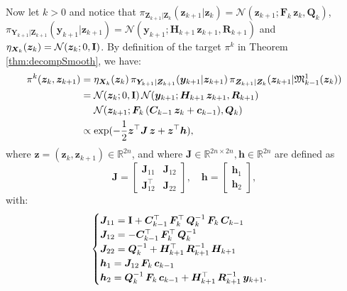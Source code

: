 \documentclass[twoside,11pt]{article}
\newcommand{\Gauss}{\mathcal{N}}                                      %
\newcommand{\re}{\mathbb{R}}
\newcommand{\Xb}{\boldsymbol{X}}
\newcommand{\Yb}{\boldsymbol{Y}}
\newcommand{\yb}{\boldsymbol{y}}
\newcommand{\Zb}{\boldsymbol{Z}}
\newcommand{\zb}{\boldsymbol{z}}
\newcommand{\Fb}{\boldsymbol{F}}
\newcommand{\Hb}{\boldsymbol{H}}
\newcommand{\hb}{\boldsymbol{h}}
\newcommand{\Qb}{\boldsymbol{Q}}
\newcommand{\Rb}{\boldsymbol{R}}
\newcommand{\Cb}{\boldsymbol{C}}
\newcommand{\cb}{\boldsymbol{c}}
\newcommand{\Jb}{\boldsymbol{J}}
\newcommand{\submap}{\mathfrak{M}}
\begin{document}
Now let $k>0$ and
notice that $\pi_{\Zb_{k+1} \vert \Zb_k}(\zb_{k+1}\vert \zb_k) = 
\Gauss( \zb_{k+1}; \Fb_k\,\zb_k, \Qb_k )$,
$\pi_{\Yb_{k+1} \vert \Zb_{k+1}}(\yb_{k+1} \vert \zb_{k+1}) = 
\Gauss( \yb_{k+1}; \Hb_{k+1}\,\zb_{k+1} , \Rb_{k+1} )$ and
$\eta_{\Xb_k}(\zb_k) = \Gauss( \zb_k; 0, {\bf I} )$.
By definition of the target $\pi^k$ in Theorem \ref{thm:decompSmooth}, we have:
\begin{align}
  \pi^k(\zb_k, \zb_{k+1}) &= \eta_{\Xb_k}(\zb_k) \,
                  \pi_{\Yb_{k+1} \vert \Zb_{k+1}}(\yb_{k+1} \vert \zb_{k+1}) \,
                  \pi_{\Zb_{k+1} \vert \Zb_k}(\zb_{k+1}\vert 
                  \submap_{k-1}^1(\zb_k) )  \\
              &=   \Gauss( \zb_k; 0, {\bf I} ) \,
                  \Gauss( \yb_{k+1}; \Hb_{k+1}\,\zb_{k+1} , \Rb_{k+1} )\,
                   \\
              &\phantom{{}={}}    
                  \Gauss( \zb_{k+1};
                  \Fb_k\,( \Cb_{k-1} \, \zb_k + \cb_{k-1}), \Qb_k ) \\
              &\propto    
                  \exp( -\frac{1}{2} \zb^\top \Jb\,\zb + \zb^\top \hb ),  
\end{align}
where $\zb = (\zb_k , \zb_{k+1})\in \re^{2n}$, and where
$\Jb \in \re^{2n \times 2n} , \hb \in \re^{2n}$ are defined as
\begin{equation}
 \Jb =  \left[\begin{array}{cc}
  \Jb_{11} & \Jb_{12} \\[3pt] 
  \Jb_{12}^\top & \Jb_{22}
  \end{array}\right], \quad
 \hb = \left[\begin{array}{c}
  \hb_{1}  \\ 
  \hb_{2}
  \end{array}\right],
\end{equation}
with:
\begin{equation}
  \begin{cases} 
    \Jb_{11} = {\bf I} + \Cb_{k-1}^\top\,\Fb_k^\top \, \Qb_k^{-1}\,\Fb_k\,\Cb_{k-1}    \\ 
    \Jb_{12} = - \Cb_{k-1}^\top\,\Fb_k^\top\,\Qb_k^{-1} \\
    \Jb_{22} = \Qb_k^{-1} + \Hb_{k+1}^\top\,\Rb_{k+1}^{-1}\,\Hb_{k+1} \\
    \hb_1 =  \Jb_{12}\,\Fb_k\,\cb_{k-1} \\
    \hb_2 =  \Qb_k^{-1}\,\Fb_k\,\cb_{k-1} +
         \Hb_{k+1}^\top \, \Rb_{k+1}^{-1}\,\yb_{k+1}.  %
  \end{cases}   
\end{equation}
\end{document}

